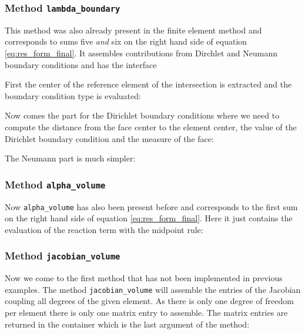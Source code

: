 \documentclass[a4paper,12pt]{article}
\begin{document}
\subsubsection*{Method \lstinline{lambda_boundary}}

This method was also already present in the finite element method
and corresponds
to sums five \textit{and} six on the right hand side of equation \eqref{eq:res_form_final}.
It assembles contributions from Dirchlet and Neumann
boundary conditions and has the interface


First  the center of the reference element of the intersection
is extracted and the boundary condition type is evaluated:


Now comes the part for the Dirichlet boundary conditions where we
need to compute the distance from the face center to the element center,
the value of the Dirichlet boundary condition and the measure of the face:

The Neumann part is much simpler:


\subsubsection*{Method \lstinline{alpha_volume}}

Now \lstinline{alpha_volume} has also been present before and corresponds
to the first sum on the right hand side of equation \eqref{eq:res_form_final}.
Here it just contains the evaluation of the reaction term 
with the midpoint rule:


\subsubsection*{Method \lstinline{jacobian_volume}}

Now we come to the first method that has not been implemented in
previous examples. The method \lstinline{jacobian_volume}
will assemble the entries of the Jacobian coupling all degrees of
the given element. As there is only one degree of freedom per element there
is only one matrix entry to assemble. The matrix entries are returned
in the container which is the last argument of the method:

\end{document}
